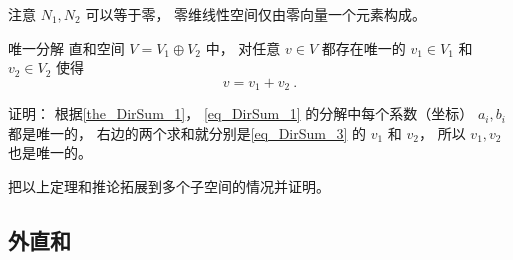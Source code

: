 注意 $N_1, N_2$ 可以等于零， 零维线性空间仅由零向量一个元素构成。

\begin{theorem}{唯一分解}
直和空间 $V = V_1 \oplus V_2$ 中， 对任意 $v \in V$ 都存在唯一的 $v_1 \in V_1$ 和 $v_2 \in V_2$ 使得
\begin{equation}\label{eq_DirSum_3}
v = v_1 + v_2~.
\end{equation}
\end{theorem}
证明： 根据\autoref{the_DirSum_1}， \autoref{eq_DirSum_1} 的分解中每个系数（坐标） $a_i, b_i$ 都是唯一的， 右边的两个求和就分别是\autoref{eq_DirSum_3} 的 $v_1$ 和 $v_2$， 所以 $v_1, v_2$ 也是唯一的。

\begin{exercise}{}
把以上定理和推论拓展到多个子空间的情况并证明。
\end{exercise}


\subsection{外直和}


